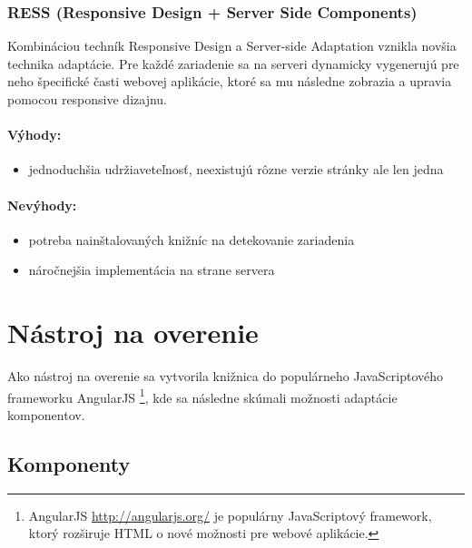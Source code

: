 
\subsubsection{RESS (Responsive Design + Server Side Components)} %
\label{ssub:ress_responsive_design_server_side_components_}

Kombináciou techník Responsive Design a Server-side Adaptation vznikla novšia technika adaptácie. Pre každé zariadenie sa na serveri dynamicky vygenerujú pre neho špecifické časti webovej aplikácie, ktoré sa mu následne zobrazia a upravia pomocou responsive dizajnu.

\paragraph{Výhody:}
\begin{itemize}
	\item jednoduchšia udržiaveteľnosť, neexistujú rôzne verzie stránky ale len jedna
\end{itemize}

\paragraph{Nevýhody:}
\begin{itemize}
	\item potreba nainštalovaných knižníc na detekovanie zariadenia
	\item náročnejšia implementácia na strane servera
\end{itemize}



\newpage
\section{Nástroj na overenie} %
\label{sec:n_stroj_na_overenie}
Ako nástroj na overenie sa vytvorila knižnica do populárneho JavaScriptového frameworku AngularJS \footnote{AngularJS \url{http://angularjs.org/} je populárny JavaScriptový framework, ktorý rozširuje HTML o nové možnosti pre webové aplikácie.}, kde sa následne skúmali možnosti adaptácie komponentov.

\subsection{Komponenty} %
\label{sub:komponenty}

